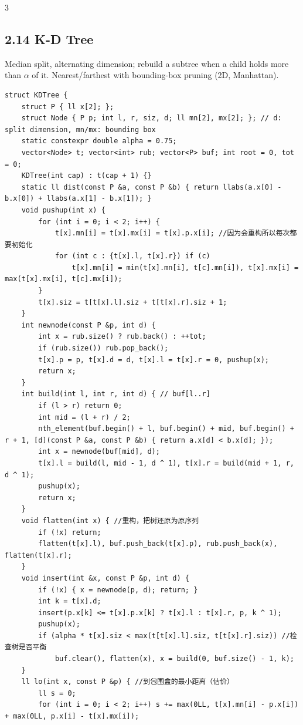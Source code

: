 \documentclass[8pt]{extarticle}
\begin{document}
\begin{multicols*}{3}
\subsection*{2.14 K-D Tree}

Median split, alternating dimension; rebuild a subtree when a child holds more than $\alpha$ of it. Nearest/farthest with bounding-box pruning (2D, Manhattan).

\begin{lstlisting}
struct KDTree {
    struct P { ll x[2]; };
    struct Node { P p; int l, r, siz, d; ll mn[2], mx[2]; }; // d: split dimension, mn/mx: bounding box
    static constexpr double alpha = 0.75;
    vector<Node> t; vector<int> rub; vector<P> buf; int root = 0, tot = 0;
    KDTree(int cap) : t(cap + 1) {}
    static ll dist(const P &a, const P &b) { return llabs(a.x[0] - b.x[0]) + llabs(a.x[1] - b.x[1]); }
    void pushup(int x) {
        for (int i = 0; i < 2; i++) {
            t[x].mn[i] = t[x].mx[i] = t[x].p.x[i]; //因为会重构所以每次都要初始化
            for (int c : {t[x].l, t[x].r}) if (c)
                t[x].mn[i] = min(t[x].mn[i], t[c].mn[i]), t[x].mx[i] = max(t[x].mx[i], t[c].mx[i]);
        }
        t[x].siz = t[t[x].l].siz + t[t[x].r].siz + 1;
    }
    int newnode(const P &p, int d) {
        int x = rub.size() ? rub.back() : ++tot;
        if (rub.size()) rub.pop_back();
        t[x].p = p, t[x].d = d, t[x].l = t[x].r = 0, pushup(x);
        return x;
    }
    int build(int l, int r, int d) { // buf[l..r]
        if (l > r) return 0;
        int mid = (l + r) / 2;
        nth_element(buf.begin() + l, buf.begin() + mid, buf.begin() + r + 1, [d](const P &a, const P &b) { return a.x[d] < b.x[d]; });
        int x = newnode(buf[mid], d);
        t[x].l = build(l, mid - 1, d ^ 1), t[x].r = build(mid + 1, r, d ^ 1);
        pushup(x);
        return x;
    }
    void flatten(int x) { //重构，把树还原为原序列
        if (!x) return;
        flatten(t[x].l), buf.push_back(t[x].p), rub.push_back(x), flatten(t[x].r);
    }
    void insert(int &x, const P &p, int d) {
        if (!x) { x = newnode(p, d); return; }
        int k = t[x].d;
        insert(p.x[k] <= t[x].p.x[k] ? t[x].l : t[x].r, p, k ^ 1);
        pushup(x);
        if (alpha * t[x].siz < max(t[t[x].l].siz, t[t[x].r].siz)) //检查树是否平衡
            buf.clear(), flatten(x), x = build(0, buf.size() - 1, k);
    }
    ll lo(int x, const P &p) { //到包围盒的最小距离（估价）
        ll s = 0;
        for (int i = 0; i < 2; i++) s += max(0LL, t[x].mn[i] - p.x[i]) + max(0LL, p.x[i] - t[x].mx[i]);

\end{lstlisting}
\end{multicols*}
\end{document}
